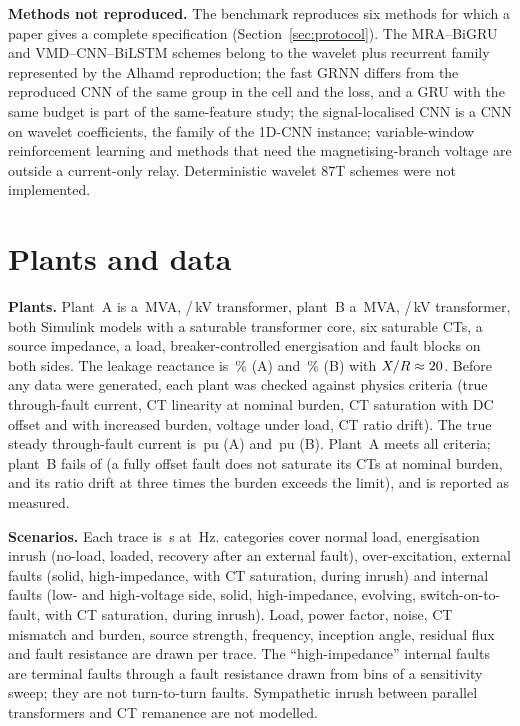 \documentclass[preprint,12pt]{elsarticle}
\begin{document}
\textbf{Methods not reproduced.} The benchmark reproduces six methods for which a paper gives a complete specification (Section~\ref{sec:protocol}). The MRA--BiGRU and VMD--CNN--BiLSTM schemes \citep{afsharisefat2023,afsharisefat2024} belong to the wavelet plus recurrent family represented by the Alhamd reproduction; the fast GRNN \citep{afrasiabi2022} differs from the reproduced CNN of the same group \citep{afrasiabi2020} in the cell and the loss, and a GRU with the same budget is part of the same-feature study; the signal-localised CNN \citep{murugan2022} is a CNN on wavelet coefficients, the family of the 1D-CNN instance; variable-window reinforcement learning \citep{wang2025} and methods that need the magnetising-branch voltage \citep{li2020} are outside a current-only relay. Deterministic wavelet 87T schemes \citep{medeiros2016,medeiros2018} were not implemented.

\section{Plants and data}
\label{sec:data}
\textbf{Plants.} Plant~A is a \mvaA\,MVA, \kvHVA/\kvLVA\,kV \vgA{} transformer, plant~B a \mvaB\,MVA, \kvHVB/\kvLVB\,kV \vgB{} transformer, both Simulink models with a saturable transformer core, six saturable CTs, a source impedance, a load, breaker-controlled energisation and fault blocks on both sides. The leakage reactance is \xA\,\% (A) and \xB\,\% (B) with $X/R\approx20$. Before any data were generated, each plant was checked against \critAN{} physics criteria (true through-fault current, CT linearity at nominal burden, CT saturation with DC offset and with increased burden, voltage under load, CT ratio drift). The true steady through-fault current is \tfA\,pu (A) and \tfB\,pu (B). Plant~A meets all \critAN{} criteria; plant~B fails \critBFail{} of \critBN{} (a fully offset fault does not saturate its CTs at nominal burden, and its ratio drift at three times the burden exceeds the limit), and is reported as measured.

\textbf{Scenarios.} Each trace is \traceLen\,s at \fs\,Hz. \nCat{} categories cover normal load, energisation inrush (no-load, loaded, recovery after an external fault), over-excitation, external faults (solid, high-impedance, with CT saturation, during inrush) and internal faults (low- and high-voltage side, solid, high-impedance, evolving, switch-on-to-fault, with CT saturation, during inrush). Load, power factor, noise, CT mismatch and burden, source strength, frequency, inception angle, residual flux and fault resistance are drawn per trace. The ``high-impedance'' internal faults are terminal faults through a fault resistance drawn from bins of a sensitivity sweep; they are not turn-to-turn faults. Sympathetic inrush between parallel transformers and CT remanence are not modelled.
\end{document}
